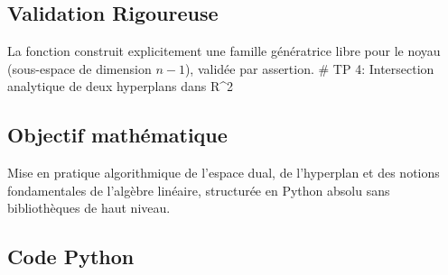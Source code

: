 \hypertarget{validation-rigoureuse-2}{%
\subsection{Validation Rigoureuse}\label{validation-rigoureuse-2}}

La fonction construit explicitement une famille génératrice libre pour
le noyau (sous-espace de dimension \(n-1\)), validée par assertion. \#
TP 4: Intersection analytique de deux hyperplans dans R\^{}2

\hypertarget{objectif-mathuxe9matique-3}{%
\subsection{Objectif mathématique}\label{objectif-mathuxe9matique-3}}

Mise en pratique algorithmique de l'espace dual, de l'hyperplan et des
notions fondamentales de l'algèbre linéaire, structurée en Python absolu
sans bibliothèques de haut niveau.

\hypertarget{code-python-3}{%
\subsection{Code Python}\label{code-python-3}}

\begin{Shaded}
\begin{Highlighting}[]
\OperatorTok{=}
    \OperatorTok{==} \NormalTok{:}
          

\OperatorTok{=}\OperatorTok{/}
\OperatorTok{=}\OperatorTok{/}

\NormalTok{, }\OperatorTok{{-}}\NormalTok{, }\NormalTok{, }\NormalTok{, }\NormalTok{, }\NormalTok{) }\OperatorTok{==}\NormalTok{ (}\NormalTok{, }\NormalTok{)}
\end{Highlighting}
\end{Shaded}


